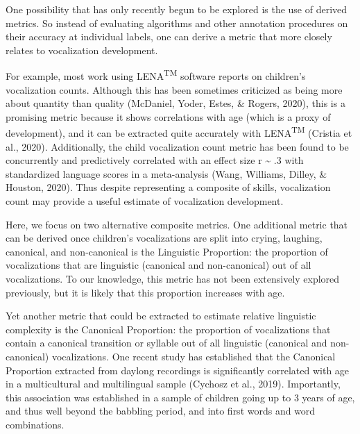 \documentclass[english,,man,floatsintext]{apa6}
\begin{document}
One possibility that has only recently begun to be explored is the use of derived metrics. So instead of evaluating algorithms and other annotation procedures on their accuracy at individual labels, one can derive a metric that more closely relates to vocalization development.

For example, most work using LENA\textsuperscript{TM} software reports on children's vocalization counts. Although this has been sometimes criticized as being more about quantity than quality (McDaniel, Yoder, Estes, \& Rogers, 2020), this is a promising metric because it shows correlations with age (which is a proxy of development), and it can be extracted quite accurately with LENA\textsuperscript{TM} (Cristia et al., 2020). Additionally, the child vocalization count metric has been found to be concurrently and predictively correlated with an effect size r \textasciitilde{} .3 with standardized language scores in a meta-analysis (Wang, Williams, Dilley, \& Houston, 2020). Thus despite representing a composite of skills, vocalization count may provide a useful estimate of vocalization development.

Here, we focus on two alternative composite metrics. One additional metric that can be derived once children's vocalizations are split into crying, laughing, canonical, and non-canonical is the Linguistic Proportion: the proportion of vocalizations that are linguistic (canonical and non-canonical) out of all vocalizations. To our knowledge, this metric has not been extensively explored previously, but it is likely that this proportion increases with age.

Yet another metric that could be extracted to estimate relative linguistic complexity is the Canonical Proportion: the proportion of vocalizations that contain a canonical transition or syllable out of all linguistic (canonical and non-canonical) vocalizations. One recent study has established that the Canonical Proportion extracted from daylong recordings is significantly correlated with age in a multicultural and multilingual sample (Cychosz et al., 2019). Importantly, this association was established in a sample of children going up to 3 years of age, and thus well beyond the babbling period, and into first words and word combinations.
\end{document}
